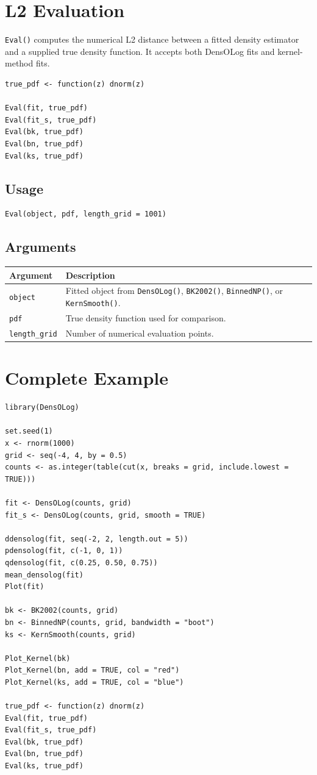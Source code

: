 \documentclass[11pt]{article}
\begin{document}
\section{L2 Evaluation}

\texttt{Eval()} computes the numerical L2 distance between a fitted density
estimator and a supplied true density function. It accepts both DensOLog fits
and kernel-method fits.

\begin{lstlisting}
true_pdf <- function(z) dnorm(z)

Eval(fit, true_pdf)
Eval(fit_s, true_pdf)
Eval(bk, true_pdf)
Eval(bn, true_pdf)
Eval(ks, true_pdf)
\end{lstlisting}

\subsection*{Usage}

\begin{lstlisting}
Eval(object, pdf, length_grid = 1001)
\end{lstlisting}

\subsection*{Arguments}

\begin{tabular}{ll}
\toprule
Argument & Description \\
\midrule
\texttt{object} & Fitted object from \texttt{DensOLog()}, \texttt{BK2002()}, \texttt{BinnedNP()}, or \texttt{KernSmooth()}. \\
\texttt{pdf} & True density function used for comparison. \\
\texttt{length\_grid} & Number of numerical evaluation points. \\
\bottomrule
\end{tabular}

\section{Complete Example}

\begin{lstlisting}
library(DensOLog)

set.seed(1)
x <- rnorm(1000)
grid <- seq(-4, 4, by = 0.5)
counts <- as.integer(table(cut(x, breaks = grid, include.lowest = TRUE)))

fit <- DensOLog(counts, grid)
fit_s <- DensOLog(counts, grid, smooth = TRUE)

ddensolog(fit, seq(-2, 2, length.out = 5))
pdensolog(fit, c(-1, 0, 1))
qdensolog(fit, c(0.25, 0.50, 0.75))
mean_densolog(fit)
Plot(fit)

bk <- BK2002(counts, grid)
bn <- BinnedNP(counts, grid, bandwidth = "boot")
ks <- KernSmooth(counts, grid)

Plot_Kernel(bk)
Plot_Kernel(bn, add = TRUE, col = "red")
Plot_Kernel(ks, add = TRUE, col = "blue")

true_pdf <- function(z) dnorm(z)
Eval(fit, true_pdf)
Eval(fit_s, true_pdf)
Eval(bk, true_pdf)
Eval(bn, true_pdf)
Eval(ks, true_pdf)
\end{lstlisting}
\end{document}

